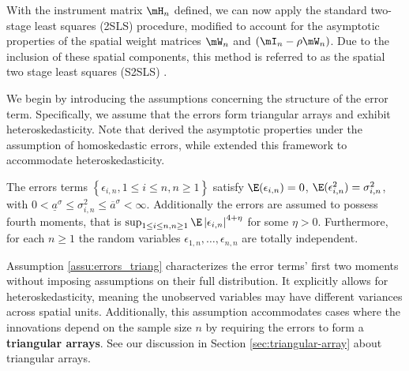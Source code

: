 \documentclass[english,12pt]{book}\usepackage[]{graphicx}\usepackage[]{xcolor}
\begin{document}
With the instrument matrix $\mH_n$ defined, we can now apply the standard two-stage least squares (2SLS) procedure, modified to account for the asymptotic properties of the spatial weight matrices $\mW_n$ and $(\mI_n - \rho\mW_n)$. Due to the inclusion of these spatial components, this method is referred to as the spatial two stage least squares (S2SLS) \citep{kelejian1998generalized}. 

We begin by introducing the assumptions concerning the structure of the error term. Specifically, we assume that the errors form triangular arrays and exhibit heteroskedasticity. Note that \cite{kelejian1998generalized} derived the asymptotic properties under the assumption of homoskedastic errors, while \cite{kelejian2010specification} extended this framework to accommodate heteroskedasticity. 



\begin{assumption}\label{assu:errors_triang}
The errors terms $\left\lbrace \epsilon_{i,n}, 1 \leq i \leq n, n\geq 1\right\rbrace$ satisfy $\E(\epsilon_{i,n})= 0$, $\E(\epsilon_{i,n}^2) = \sigma^2_{i,n}$, with $0 < \underline{a}^\sigma \leq \sigma^2_{i,n}\leq \overline{a}^\sigma<\infty$. Additionally the errors are assumed to possess fourth moments, that is $\sup_{1\leq i \leq n, n\geq 1}\E\left|\epsilon_{i, n}\right|^{4 + \eta}$ for some $\eta > 0$.  Furthermore, for each $n\geq 1$ the random variables $\epsilon_{1, n}, \ldots, \epsilon_{n, n}$ are totally independent. 
\end{assumption}

Assumption \ref{assu:errors_triang} characterizes the error terms' first two moments without imposing assumptions on their full distribution. It explicitly allows for heteroskedasticity, meaning the unobserved variables may have different variances across spatial units. Additionally, this assumption accommodates cases where the innovations depend on the sample size $n$ by requiring the errors to form a \textbf{triangular arrays}. See our discussion in Section \ref{sec:triangular-array} about triangular arrays. 
\end{document}
